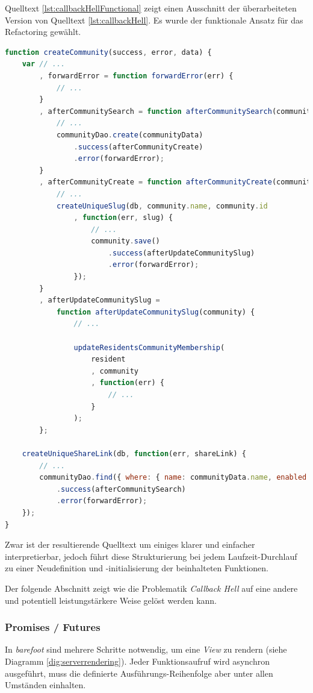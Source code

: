 Quelltext \ref{lst:callbackHellFunctional} zeigt einen Ausschnitt der überarbeiteten Version von Quelltext \ref{lst:callbackHell}. Es wurde der funktionale Ansatz für das Refactoring gewählt.

\begin{lstlisting}[language=JavaScript, firstnumber=192, caption={Ausschnitt aus dem neusten Community Controller \cite{masterCommunityController}}, label={lst:callbackHellFunctional}]
function createCommunity(success, error, data) {
	var // ...
		, forwardError = function forwardError(err) {
			// ...
		}
		, afterCommunitySearch = function afterCommunitySearch(community) {
			// ...
			communityDao.create(communityData)
				.success(afterCommunityCreate)
				.error(forwardError);
		}
		, afterCommunityCreate = function afterCommunityCreate(community) {
			// ...
			createUniqueSlug(db, community.name, community.id
				, function(err, slug) {
					// ...
					community.save()
						.success(afterUpdateCommunitySlug)
						.error(forwardError);
				});
		}
		, afterUpdateCommunitySlug =
			function afterUpdateCommunitySlug(community) {
				// ...

				updateResidentsCommunityMembership(
					resident
					, community
					, function(err) {
						// ...
					}
				);
		};

	createUniqueShareLink(db, function(err, shareLink) {
		// ...
		communityDao.find({ where: { name: communityData.name, enabled: true }})
			.success(afterCommunitySearch)
			.error(forwardError);
	});
}
\end{lstlisting}

Zwar ist der resultierende Quelltext um einiges klarer und einfacher interpretierbar, jedoch führt diese Strukturierung bei jedem Laufzeit-Durchlauf zu einer Neudefinition und -initialisierung der beinhalteten Funktionen.

Der folgende Abschnitt zeigt wie die Problematik \emph{Callback Hell} auf eine andere und potentiell leistungstärkere Weise gelöst werden kann.


\subsubsection*{Promises / Futures}

In \emph{barefoot} sind mehrere Schritte notwendig, um eine \emph{View} zu rendern (siehe Diagramm \ref{dig:serverrendering}).
Jeder Funktionsaufruf wird asynchron ausgeführt, muss die definierte Ausführungs-Reihenfolge aber unter allen Umständen einhalten.

